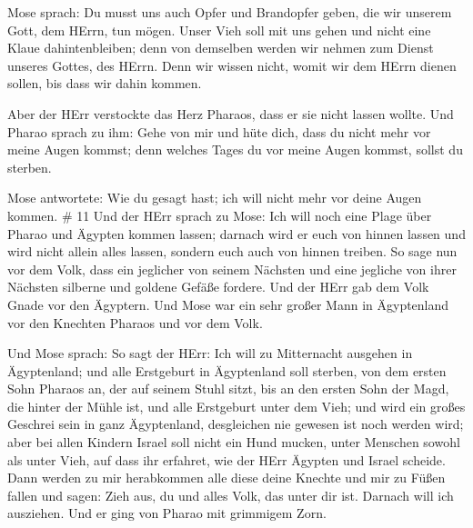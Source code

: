  Mose sprach: Du musst uns auch Opfer und Brandopfer geben,
die wir unserem Gott, dem HErrn, tun mögen.  Unser Vieh
soll mit uns gehen und nicht eine Klaue dahintenbleiben; denn von
demselben werden wir nehmen zum Dienst unseres Gottes, des HErrn. Denn
wir wissen nicht, womit wir dem HErrn dienen sollen, bis dass wir dahin
kommen.

 Aber der HErr verstockte das Herz Pharaos, dass er sie
nicht lassen wollte.  Und Pharao sprach zu ihm: Gehe von
mir und hüte dich, dass du nicht mehr vor meine Augen kommst; denn
welches Tages du vor meine Augen kommst, sollst du sterben.

 Mose antwortete: Wie du gesagt hast; ich will nicht mehr
vor deine Augen kommen. \# 11  Und der HErr sprach zu Mose:
Ich will noch eine Plage über Pharao und Ägypten kommen lassen; darnach
wird er euch von hinnen lassen und wird nicht allein alles lassen,
sondern euch auch von hinnen treiben.  So sage nun vor dem
Volk, dass ein jeglicher von seinem Nächsten und eine jegliche von ihrer
Nächsten silberne und goldene Gefäße fordere.  Und der HErr
gab dem Volk Gnade vor den Ägyptern. Und Mose war ein sehr großer Mann
in Ägyptenland vor den Knechten Pharaos und vor dem Volk.

 Und Mose sprach: So sagt der HErr: Ich will zu Mitternacht
ausgehen in Ägyptenland;  und alle Erstgeburt in Ägyptenland
soll sterben, von dem ersten Sohn Pharaos an, der auf seinem Stuhl
sitzt, bis an den ersten Sohn der Magd, die hinter der Mühle ist, und
alle Erstgeburt unter dem Vieh;  und wird ein großes
Geschrei sein in ganz Ägyptenland, desgleichen nie gewesen ist noch
werden wird;  aber bei allen Kindern Israel soll nicht ein
Hund mucken, unter Menschen sowohl als unter Vieh, auf dass ihr
erfahret, wie der HErr Ägypten und Israel scheide.  Dann
werden zu mir herabkommen alle diese deine Knechte und mir zu Füßen
fallen und sagen: Zieh aus, du und alles Volk, das unter dir ist.
Darnach will ich ausziehen. Und er ging von Pharao mit grimmigem Zorn.

